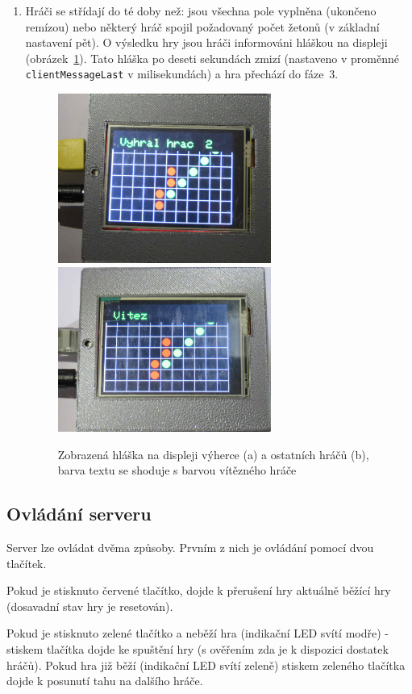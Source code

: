 \begin{enumerate}
\item Hráči se střídají do té doby než: jsou všechna pole vyplněna (ukončeno remízou) nebo některý hráč spojil požadovaný počet žetonů (v základní nastavení pět). O výsledku hry jsou hráči informováni hláškou na displeji (obrázek~\ref{fig:faze6}). Tato hláška po deseti sekundách zmizí (nastaveno v proměnné \texttt{clientMessageLast} v milisekundách) a hra přechází do fáze~3.
\begin{figure}[H]
\centering
\includegraphics[width=7cm, angle=0]{img/gameFlow/phase06a.jpg}
\includegraphics[width=7cm, angle=0]{img/gameFlow/phase06b.jpg}
\caption{\label{fig:faze6} Zobrazená hláška na displeji výherce (a) a ostatních hráčů (b), barva textu se shoduje s barvou vítězného hráče}
\end{figure}
\end{enumerate}
\subsection{Ovládání serveru}
Server lze ovládat dvěma způsoby. Prvním z nich je ovládání pomocí dvou tlačítek.

Pokud je stisknuto červené tlačítko, dojde k přerušení hry aktuálně běžící hry (dosavadní stav hry je resetován).

Pokud je stisknuto zelené tlačítko a neběží hra (indikační LED svítí modře) - stiskem tlačítka dojde ke spuštění hry (s ověřením zda je k dispozici dostatek hráčů).
Pokud hra již běží (indikační LED svítí zeleně) stiskem zeleného tlačítka dojde k posunutí tahu na dalšího hráče.


